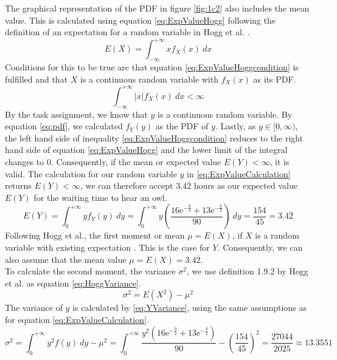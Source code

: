 The graphical representation of the PDF in figure \ref{fig:1c2} also includes the mean value. This is calculated using equation \ref{eq:ExpValueHogg} following the definition of an expectation for a random variable in Hogg et al. \cite[Definition~1.8.1]{hogg}.
\begin{equation}
E(X) = \int^{+\infty}_{-\infty} x f_X(x) ~ dx
\label{eq:ExpValueHogg}
\end{equation}
Conditions for this to be true are that equation \ref{eq:ExpValueHoggcondition} is fulfilled and that $X$ is a continuous random variable with $f_X(x)$ as its PDF.
\begin{equation}
\int^{+\infty}_{-\infty} |x| f_X(x) ~ dx < \infty
\label{eq:ExpValueHoggcondition}
\end{equation}
By the task assignment, we know that $y$ is a continuous random variable. By equation \ref{eq:pdf}, we calculated $f_Y(y)$ as the PDF of $y$. Lastly, as $y \in [0,\infty)$, the left hand side of inequality \ref{eq:ExpValueHoggcondition} reduces to the right hand side of equation \ref{eq:ExpValueHogg} and the lower limit of the integral changes to 0. Consequently, if the mean or expected value $E(Y) < \infty$, it is valid. The calculation for our random variable $y$ in \ref{eq:ExpValueCalculation} returns $E(Y) < \infty$, we can therefore accept $3.4\overline{2}$ hours as our expected value $E(Y)$ for the waiting time to hear an owl. 
%
\begin{equation}
E(Y) = \int^{+\infty}_{0} y f_Y(y) ~ dy = \int^{+\infty}_{0} y\left(\dfrac{16\mathrm{e}^{-\frac{y}{4}}+13\mathrm{e}^{-\frac{y}{2}}}{90} \right) ~dy = \frac{154}{45} = 3.4\overline{2}
\label{eq:ExpValueCalculation}
\end{equation}
Following Hogg et al., the first moment or mean $\mu = E(X)$, if $X$ is a random variable with existing expectation \cite[Definition~1.9.1]{hogg}. This is the case for $Y$. Consequently, we can also assume that the mean value $\mu = E(X) = 3.4\overline{2}$. 
\\

To calculate the second moment, the variance $\sigma^2$, we use definition 1.9.2 by Hogg et al. \cite{hogg} as equation \ref{eq:HoggVariance}.
\begin{equation}
\sigma^2 = E(X^2) - \mu^2
\label{eq:HoggVariance}
\end{equation}
%
The variance of $y$ is calculated by \ref{eq:YVariance}, using the same assumptions as for equation \ref{eq:ExpValueCalculation}.
\begin{equation}
\sigma^2 = \int^{+\infty}_{0} y^2 f(y) ~ dy - \mu^2
= \int^{+\infty}_{0} \dfrac{y^2\left(16\mathrm{e}^{-\frac{y}{4}}+13\mathrm{e}^{-\frac{y}{2}}\right)}{90} - \left(\frac{154}{45}\right)^2
= \frac{27044}{2025} \approx 13.3551
\label{eq:YVariance}
\end{equation}


